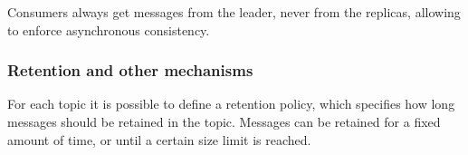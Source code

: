 Consumers always get messages from the leader, never from the replicas, allowing to enforce asynchronous consistency.

\subsubsection{Retention and other mechanisms}

For each topic it is possible to define a retention policy, which specifies how long messages should be retained in the topic. Messages can be retained for a fixed amount of time, or until a certain size limit is reached.

